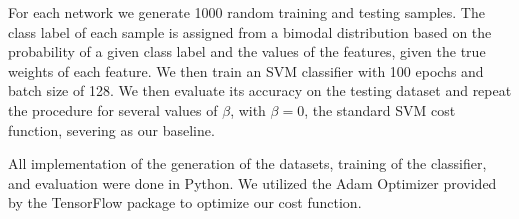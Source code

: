 %            
%			
%			
%

For each network we generate 1000 random training and testing samples. The class label of each sample is assigned from a bimodal distribution based on the probability of a given class label and the values of the features, given the true weights of each feature.  We then train an SVM classifier with 100 epochs and batch size of 128. We then evaluate its accuracy on the testing dataset and repeat the procedure for several values of $\beta$, with $\beta = 0$, the standard SVM cost function, severing as our baseline.

All implementation of the generation of the datasets, training of the classifier, and evaluation were done in Python. We utilized the Adam Optimizer provided by the TensorFlow package to optimize our cost function.